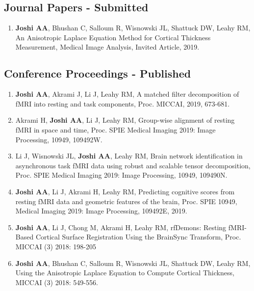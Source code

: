 \documentclass[overlapped,line,letterpaper]{res}
\begin{document}
\begin{resume}

\subsection{Journal Papers - Submitted}
\begin{enumerate}
\item \textbf{Joshi AA}, Bhushan C, Salloum R, Wisnowski JL, Shattuck DW, Leahy RM, {An Anisotropic Laplace Equation Method for Cortical Thickness Measurement}, Medical Image Analysis, Invited Article, 2019.

\end{enumerate}

\subsection{Conference Proceedings - Published}
\begin{enumerate}

    \item \textbf{Joshi AA}, Akrami J, Li J, Leahy RM, {A matched filter decomposition of fMRI into resting and task components}, Proc. MICCAI, 2019, 673-681.

    \item Akrami H, \textbf{Joshi AA}, Li J, Leahy RM, {Group-wise alignment of resting fMRI in space and time}, {Proc. SPIE Medical Imaging 2019}: Image Processing, 10949, 109492W.

    \item Li J, Wisnowski JL, \textbf{Joshi AA}, Leahy RM, {Brain network identification in asynchronous task fMRI data using robust and scalable tensor decomposition}, {Proc. SPIE Medical Imaging 2019}: Image Processing, 10949, 109490N. 

    \item \textbf{Joshi AA}, Li J, Akrami H, Leahy RM, {Predicting cognitive scores from resting fMRI data and geometric features of the brain}, {Proc. SPIE 10949, Medical Imaging 2019}: Image Processing, 109492E, 2019.
    
    \item \textbf{Joshi AA}, Li J, Chong M, Akrami H, Leahy RM, {rfDemons: Resting fMRI-Based Cortical Surface Registration Using the BrainSync Transform}, Proc. MICCAI (3) 2018: 198-205

    \item \textbf{Joshi AA}, Bhushan C, Salloum R, Wisnowski JL, Shattuck DW, Leahy RM, {Using the Anisotropic Laplace Equation to Compute Cortical Thickness}, MICCAI (3) 2018: 549-556. 


\end{enumerate}
\end{resume}
\end{document}
